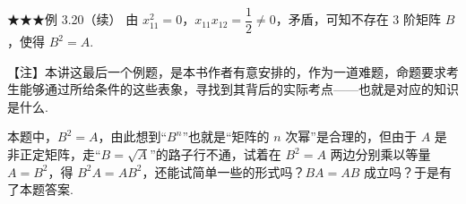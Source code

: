 \begin{fcard}{★★★例 3.20（续）}
由 $x_{11}^{2}=0$，$x_{11}x_{12}=\dfrac{1}{2}\neq0$，矛盾，可知不存在 3 阶矩阵 $B$，使得 $B^{2}=A$.
\end{fcard}

\begin{fnote}
【注】本讲这最后一个例题，是本书作者有意安排的，作为一道难题，命题要求考生能够通过所给条件的这些表象，寻找到其背后的实际考点——也就是对应的知识是什么.

本题中，$B^{2}=A$，由此想到“$B^{n}$”也就是“矩阵的 $n$ 次幂”是合理的，但由于 $A$ 是非正定矩阵，走“$B=\sqrt{A}$”的路子行不通，试着在 $B^{2}=A$ 两边分别乘以等量 $A=B^{2}$，得 $B^{2}A=AB^{2}$，还能试简单一些的形式吗？$BA=AB$ 成立吗？于是有了本题答案.
\end{fnote}

